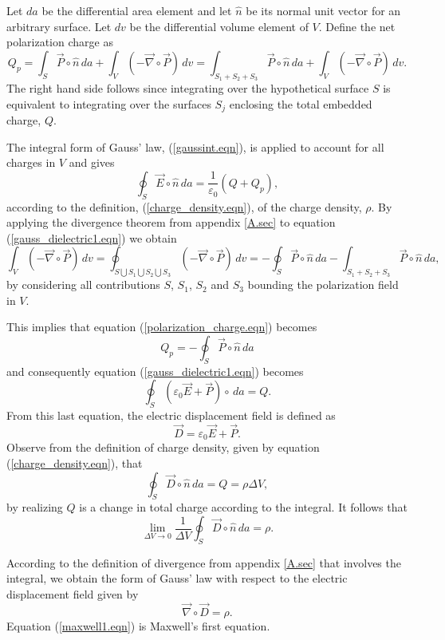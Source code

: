 \documentclass[12pt]{article}
\theoremstyle{definition}
\numberwithin{equation}{section}
\begin{document}
Let $da$ be the differential area element and let $\hat{n}$ be its normal unit vector for an arbitrary surface. Let $dv$ be the differential volume element of $V$. Define the net polarization charge as
\begin{equation}
Q_p=\int_S\vec{P}\circ\hat{n}\,da+\int_V\left(-\vec{\nabla}\circ\vec{P}\right)\,dv=\int_{S_1+S_2+S_3}\vec{P}\circ\hat{n}\,da+\int_V\left(-\vec{\nabla}\circ\vec{P}\right)\,dv.
\label{polarization_charge.eqn}
\end{equation}
The right hand side follows since integrating over the hypothetical surface $S$ is equivalent to integrating over the surfaces $S_j$ enclosing the total embedded charge, $Q$.

The integral form of Gauss' law, (\ref{gaussint.eqn}), is applied to account for all charges in $V$ and gives
\begin{equation}
\oint_S\vec{E}\circ\hat{n}\,da=\frac{1}{\varepsilon_0}\left(Q+Q_p\right),
\label{gauss_dielectric1.eqn}
\end{equation}
according to the definition, (\ref{charge_density.eqn}), of the charge density, $\rho$. By applying the divergence theorem from appendix \ref{A.sec} to equation (\ref{gauss_dielectric1.eqn}) we obtain
$$\int_V\left(-\vec{\nabla}\circ\vec{P}\right)\,dv=\oint_{S\bigcup S_1\bigcup S_2\bigcup S_3}\left(-\vec{\nabla}\circ\vec{P}\right)\,dv=-\oint_S\vec{P}\circ\hat{n}\,da-\int_{S_1+S_2+S_3}\vec{P}\circ\hat{n}\,da,$$
by considering all contributions $S$, $S_1$, $S_2$ and $S_3$ bounding the polarization field in $V$.

This implies that equation (\ref{polarization_charge.eqn}) becomes
$$Q_p=-\oint_S\vec{P}\circ\hat{n}\,da$$
and consequently equation (\ref{gauss_dielectric1.eqn}) becomes
$$\oint_S\left(\varepsilon_0\vec{E}+\vec{P}\right)\circ\,da=Q.$$ From this last equation, the electric displacement field is defined as
\begin{equation}
\vec{D}=\varepsilon_0\vec{E}+\vec{P}.
\nonumber
\end{equation}
Observe from the definition of charge density,  given by equation (\ref{charge_density.eqn}), that
\begin{equation}
\oint_S\vec{D}\circ\hat{n}\,da=Q=\rho\Delta V,
\label{displacement_field2.eqn}
\end{equation}
by realizing $Q$ is a change in total charge according to the integral. It follows that
$$\lim_{\Delta V\rightarrow 0}\frac{1}{\Delta V}\oint_S\vec{D}\circ\hat{n}\,da=\rho.$$

According to the definition of divergence from appendix \ref{A.sec} that involves the integral, we obtain the form of Gauss' law with respect to the electric displacement field given by
\begin{equation}
\vec{\nabla}\circ\vec{D}=\rho.
\label{maxwell1.eqn}
\end{equation}
Equation (\ref{maxwell1.eqn}) is Maxwell's first equation.
\end{document}
